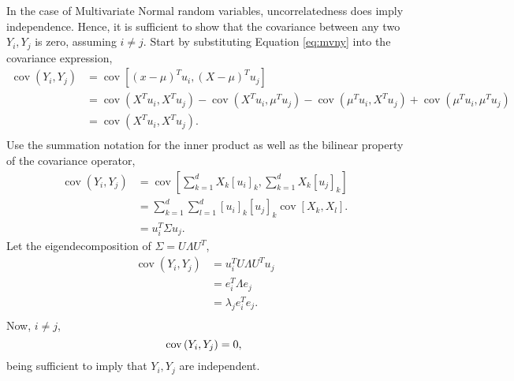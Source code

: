 \documentclass{article}[12pt]
\begin{document}
\begin{enumerate}
	In the case of Multivariate Normal random variables, uncorrelatedness does imply independence. Hence, it is sufficient to show that the covariance between any two $Y_i, Y_j$ is zero, assuming $i \ne j$. Start by substituting Equation \ref{eq:mvny} into the covariance expression,
	\begin{equation}
		\begin{aligned}
			\operatorname{cov} \left( Y_i, Y_j \right) &= \operatorname{cov} \left[ \left( x - \mu \right)^T u_i, \left( X - \mu \right)^T u_j \right] \\
								   &= \operatorname{cov} \left( X^T u_i, X^T u_j \right) 
								   - \operatorname{cov} \left( X^T u_i, \mu^T u_j \right) - \operatorname{cov} \left( \mu^T u_i, X^T u_j \right) + \operatorname{cov} \left( \mu^T u_i, \mu^T u_j \right)\\
								   &= \operatorname{cov} \left( X^T u_i, X^T u_j \right).\\
		\end{aligned}
	\end{equation}
Use the summation notation for the inner product as well as the bilinear property of the covariance operator,
\begin{equation}
	\begin{aligned}
		\operatorname{cov} \left( Y_i, Y_j \right) &= \operatorname{cov} \left[ \sum^{d}_{k=1} X_k \left[ u_i \right]_k, \sum^{d}_{k=1} X_k \left[ u_j \right]_k   \right] \\
							   &= \sum^{d}_{k=1} \sum^{d}_{l=1} \left[ u_i \right]_k \left[ u_j \right]_k \operatorname{cov} \left[ X_k, X_l \right].\\  
							   &= u_i^T \Sigma u_j.
	\end{aligned}
\end{equation}
Let the eigendecomposition of $\Sigma = U \Lambda U^T$,
\begin{equation} \label{eq:sigdecomp}
	\begin{aligned}
		\operatorname{cov} \left( Y_i, Y_j \right)	&= u_i^T U \Lambda U^T u_j \\
								&= e_i^T \Lambda e_j \\
								&= \lambda_j e_i^T e_j. \\
	\end{aligned}
\end{equation}
Now, $i \ne j$,
\begin{equation}
	\operatorname{cov} \left( Y_i, Y_j \right) = 0,\\
\end{equation}
being sufficient to imply that $Y_i, Y_j$ are independent.


\end{enumerate}
\end{document}
